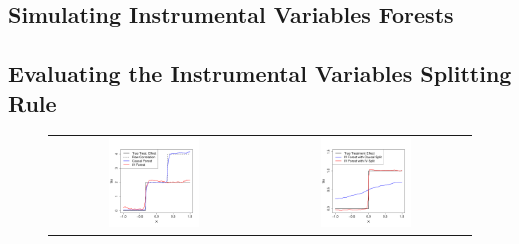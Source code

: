 \documentclass[aos]{imsart}
\theoremstyle{plain}
\theoremstyle{definition}
\theoremstyle{remark}
\newcommand{\FIGW}{0.45}
\begin{document}
\begin{CJK}{UTF8}{gbsn}
{\begin{appendix}
\section{Simulating Instrumental Variables Forests}
\label{sec:iv_simu}


\subsection{Evaluating the Instrumental Variables Splitting Rule}
\label{sec:iv_split}

\begin{figure}
\centering
\begin{tabular}{cc}
\includegraphics[width=\FIGW\textwidth]{IV_plot_10k_20.pdf} &
\includegraphics[width=\FIGW\textwidth]{IV_forest_causal_splitting.pdf}

\end{tabular}
\end{figure}
\end{appendix}}
\end{CJK}
\end{document}
